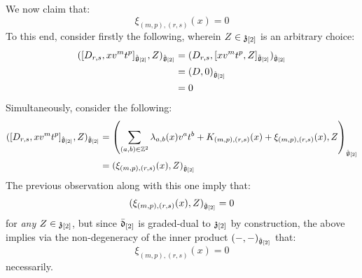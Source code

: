 \begin{remark}
\begin{itemize}
                    We now claim that:
                        $$\xi_{(m, p), (r, s)}(x) = 0$$
                    To this end, consider firstly the following, wherein $Z \in \mathfrak{z}_{[2]}$ is an arbitrary choice:
                        $$
                            \begin{aligned}
                                ( [D_{r, s}, x v^m t^p]_{\hat{\mathfrak{g}}_{[2]}}, Z )_{\hat{\mathfrak{g}}_{[2]}} & = ( D_{r, s}, [x v^m t^p, Z]_{\tilde{\mathfrak{g}}_{[2]}} )_{\hat{\mathfrak{g}}_{[2]}}
                                \\
                                & = (D, 0)_{\hat{\mathfrak{g}}_{[2]}}
                                \\
                                & = 0
                            \end{aligned}
                        $$
                    Simultaneously, consider the following:
                        $$
                            \begin{aligned}
                                ( [D_{r, s}, x v^m t^p]_{\hat{\mathfrak{g}}_{[2]}}, Z )_{\hat{\mathfrak{g}}_{[2]}} & = \left( \sum_{(a, b) \in \mathbb{Z}^2} \lambda_{a, b}(x) v^a t^b + K_{(m, p), (r, s)}(x) + \xi_{(m, p), (r, s)}(x), Z \right)_{\hat{\mathfrak{g}}_{[2]}}
                                \\
                                & = ( \xi_{(m, p), (r, s)}(x), Z )_{\hat{\mathfrak{g}}_{[2]}}
                            \end{aligned}
                        $$
                    The previous observation along with this one imply that:
                        $$( \xi_{(m, p), (r, s)}(x), Z )_{\hat{\mathfrak{g}}_{[2]}} = 0$$
                    for \textit{any} $Z \in \mathfrak{z}_{[2]}$, but since $\bar{\mathfrak{d}}_{[2]}$ is graded-dual to $\mathfrak{z}_{[2]}$ by construction, the above implies via the non-degeneracy of the inner product $(-, -)_{\hat{\mathfrak{g}}_{[2]}}$ that:
                        $$\xi_{(m, p), (r, s)}(x) = 0$$
                    necessarily. 


\end{itemize}
\end{remark}
